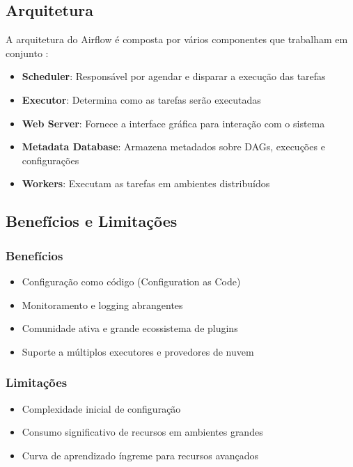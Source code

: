 \subsection{Arquitetura}

A arquitetura do Airflow é composta por vários componentes que trabalham em conjunto \cite{sharma2021apache}:

\begin{itemize}
\item \textbf{Scheduler}: Responsável por agendar e disparar a execução das tarefas
\item \textbf{Executor}: Determina como as tarefas serão executadas
\item \textbf{Web Server}: Fornece a interface gráfica para interação com o sistema
\item \textbf{Metadata Database}: Armazena metadados sobre DAGs, execuções e configurações
\item \textbf{Workers}: Executam as tarefas em ambientes distribuídos
\end{itemize}

\subsection{Benefícios e Limitações}

\subsubsection{Benefícios}
\begin{itemize}
\item Configuração como código (Configuration as Code)
\item Monitoramento e logging abrangentes
\item Comunidade ativa e grande ecossistema de plugins
\item Suporte a múltiplos executores e provedores de nuvem
\end{itemize}

\subsubsection{Limitações}
\begin{itemize}
\item Complexidade inicial de configuração
\item Consumo significativo de recursos em ambientes grandes
\item Curva de aprendizado íngreme para recursos avançados
\end{itemize}

